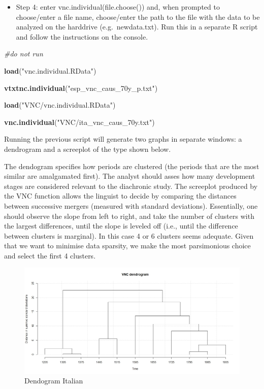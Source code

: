 \documentclass[
]{article}
\newenvironment{Shaded}{\begin{snugshade}}{\end{snugshade}}
\newcommand{\CommentTok}[1]{\textcolor[rgb]{0.56,0.35,0.01}{\textit{#1}}}
\newcommand{\FunctionTok}[1]{\textcolor[rgb]{0.13,0.29,0.53}{\textbf{#1}}}
\newcommand{\NormalTok}[1]{#1}
\newcommand{\StringTok}[1]{\textcolor[rgb]{0.31,0.60,0.02}{#1}}
\providecommand{\tightlist}{%
  \setlength{\itemsep}{0pt}\setlength{\parskip}{0pt}}
\begin{document}
\begin{itemize}
\tightlist
\item
  Step 4: enter vnc.individual(file.choose()) and, when prompted to
  choose/enter a file name, choose/enter the path to the file with the
  data to be analyzed on the harddrive (e.g.~newdata.txt). Run this in a
  separate R script and follow the instructions on the console.
\end{itemize}

\begin{Shaded}
\begin{Highlighting}[]
\CommentTok{\#do not run}

\FunctionTok{load}\NormalTok{(}\StringTok{"vnc.individual.RData"}\NormalTok{)}

\FunctionTok{vtxtnc.individual}\NormalTok{(}\StringTok{"esp\_vnc\_caus\_70y\_p.txt"}\NormalTok{)}

\FunctionTok{load}\NormalTok{(}\StringTok{"VNC/vnc.individual.RData"}\NormalTok{)}

\FunctionTok{vnc.individual}\NormalTok{(}\StringTok{"VNC/ita\_vnc\_caus\_70y.txt"}\NormalTok{)}
\end{Highlighting}
\end{Shaded}

Running the previous script will generate two graphs in separate
windows: a dendrogram and a screeplot of the type shown below.

The dendogram specifies how periods are clustered (the periods that are
the most similar are amalgamated first). The analyst should asses how
many development stages are considered relevant to the diachronic study.
The screeplot produced by the VNC function allows the linguist to decide
by comparing the distances between successive mergers (measured with
standard deviations). Essentially, one should observe the slope from
left to right, and take the number of clusters with the largest
differences, until the slope is leveled off (i.e., until the difference
between clusters is marginal). In this case 4 or 6 clusters seems
adequate. Given that we want to minimise data sparsity, we make the most
parsimonious choice and select the first 4 clusters.

\begin{figure}
\centering
\includegraphics{ita_dendro_apr25.jpeg}
\caption{Dendogram Italian}
\end{figure}
\end{document}
